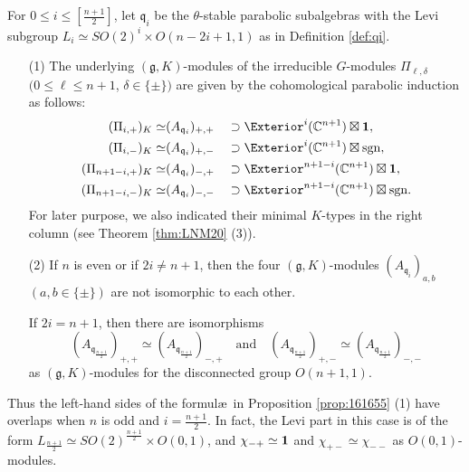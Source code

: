 \begin{proposition}
\label{prop:161655}
For $0 \le i \le [\frac {n+1}2]$, 
 let 
${\mathfrak{q}}_i$ be the $\theta$-stable parabolic subalgebras
 with the Levi subgroup $L_i \simeq SO(2)^i \times O(n-2i+1,1)$
 as in Definition \ref{def:qi}.  
\begin{enumerate}
\item[{\rm{(1)}}]
The underlying $({\mathfrak {g}},K)$-modules
 of the irreducible $G$-modules $\Pi_{\ell, \delta}$
 $(0 \le \ell \le n+1$, $\delta \in \{\pm\})$
 are given by the cohomological parabolic induction
 as follows:
\begin{alignat*}{2}
  (\Pi_{i,+})_K \simeq& (A_{\mathfrak {q}_i})_{+,+} 
&& \supset \Exterior^i({\mathbb{C}}^{n+1}) \boxtimes {\bf{1}}, 
\\
   (\Pi_{i,-})_K \simeq & (A_{\mathfrak {q}_i})_{+,-}
&& \supset \Exterior^i({\mathbb{C}}^{n+1}) \boxtimes {\operatorname{sgn}}, 
\\
   (\Pi_{n+1-i,+})_K \simeq & (A_{\mathfrak {q}_i})_{-,+}
&& \supset \Exterior^{n+1-i}({\mathbb{C}}^{n+1}) \boxtimes {\bf{1}}, 
\\
  (\Pi_{n+1-i,-})_K \simeq & (A_{\mathfrak {q}_i})_{-,-}
&& \supset \Exterior^{n+1-i}({\mathbb{C}}^{n+1}) 
\boxtimes {\operatorname{sgn}}.  
\end{alignat*}
For later purpose, 
 we also indicated their 
 minimal $K$-types
 in the right column
 (see Theorem \ref{thm:LNM20} (3)).  
\item[{\rm{(2)}}]
If $n$ is even or if $2i\ne n+1$, 
 then the four $({\mathfrak{g}},K)$-modules
 $(A_{\mathfrak{q}_i})_{a,b}$ $(a,b \in \{\pm\})$ are not isomorphic to each other.  



If $2i=n+1$, 
 then there are isomorphisms
\[
   (A_{\mathfrak {q}_{\frac{n+1}{2}}})_{+,+}
 \simeq 
   (A_{\mathfrak {q}_{\frac{n+1}{2}}})_{-,+}
\quad
\text{and}
\quad 
   (A_{\mathfrak {q}_{\frac{n+1}{2}}})_{+,-}
\simeq
   (A_{\mathfrak {q}_{\frac{n+1}{2}}})_{-,-}
\]
 as $({\mathfrak {g}}, K)$-modules
 for the disconnected group $O(n+1,1)$.  
\end{enumerate}
\end{proposition}
Thus the left-hand sides of the formul\ae\ 
 in Proposition \ref{prop:161655} (1) have overlaps
 when $n$ is odd and $i=\frac{n+1}{2}$.  
In fact, 
the Levi part in this case is of the form 
 $L_{\frac{n+1}{2}} \simeq SO(2)^{\frac{n+1}{2}} \times O(0,1)$, 
 and $\chi_{-+} \simeq {\bf{1}}$
 and $\chi_{+-} \simeq \chi_{--}$
 as $O(0,1)$-modules.  

